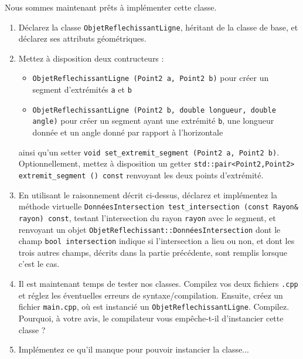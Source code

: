 \documentclass{book}
\newcommand{\inline}[1]{\texttt{#1}}
\def\filename{\texttt}
\begin{document}
Nous sommes maintenant prêts à implémenter cette classe.

\begin{enumerate}

  \item Déclarez la classe \inline{ObjetReflechissantLigne}, héritant de la classe de base, et déclarez ses attributs géométriques.

  \item Mettez à disposition deux contructeurs :
  \begin{itemize}
    \item \inline{ObjetReflechissantLigne (Point2 a, Point2 b)} pour créer un segment d'extrémités \inline{a} et \inline{b}
    \item \inline{ObjetReflechissantLigne (Point2 b, double longueur, double angle)} pour créer un segment ayant une extrémité \inline{b}, une longueur donnée et un angle donné par rapport à l'horizontale
  \end{itemize}
  ainsi qu'un setter \inline{void set_extremit_segment (Point2 a, Point2 b)}. Optionnellement, mettez à disposition un getter \inline{std::pair<Point2,Point2> extremit_segment () const} renvoyant les deux points d'extrémité.

  \item En utilisant le raisonnement décrit ci-dessus, déclarez et implémentez la méthode virtuelle \inline{DonnéesIntersection test_intersection (const Rayon& rayon) const}, testant l'intersection du rayon \inline{rayon} avec le segment, et renvoyant un objet \inline{ObjetReflechissant::DonnéesIntersection} dont le champ \inline{bool intersection} indique si l'intersection a lieu ou non, et dont les trois autres champs, décrits dans la partie précédente, sont remplis lorsque c'est le cas.

  \item Il est maintenant temps de tester nos classes. Compilez vos deux fichiers \filename{.cpp} et réglez les éventuelles erreurs de syntaxe/compilation. Ensuite, créez un fichier \filename{main.cpp}, où est instancié un \inline{ObjetReflechissantLigne}. Compilez. Pourquoi, à votre avis, le compilateur vous empêche-t-il d'instancier cette classe ?

  \item Implémentez ce qu'il manque pour pouvoir instancier la classe...
\end{enumerate}
\end{document}
